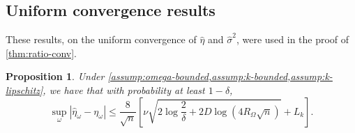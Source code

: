 \documentclass{article}
\newtheorem{prop}[theorem]{Proposition}  \crefname{prop}{Proposition}{Propositions}
\begin{document}
\subsection{Uniform convergence results} \label{sec:proof:unif-conv}
These results, on the uniform convergence of $\hat\eta$ and $\hat\sigma^2$,
were used in the proof of \cref{thm:ratio-conv}.

\begin{prop}
\label{thm:mmd-conv}
Under \cref{assump:omega-bounded,assump:k-bounded,assump:k-lipschitz},
we have that with probability at least $1 - \delta$,
\begin{equation*}
    \sup_\omega \left\lvert \hat\eta_\omega - \eta_\omega \right\rvert
    \le \frac{8}{\sqrt n} \left[
        \nu \sqrt{2 \log\frac2\delta + 2 D \log\left( 4 R_\Omega \sqrt n \right)}
      + L_k
      \right]
.\end{equation*}
\end{prop}
\end{document}
